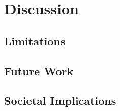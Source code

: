 \section{Discussion }
\label{disc}
\subsection{Limitations}
\subsection{Future Work}
\subsection{Societal Implications}

